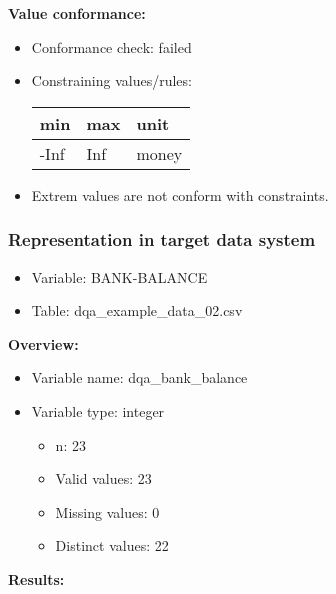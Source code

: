 \documentclass[
]{article}
\providecommand{\tightlist}{%
  \setlength{\itemsep}{0pt}\setlength{\parskip}{0pt}}
\begin{document}
\textbf{Value conformance:}

\begin{itemize}
\tightlist
\item
  Conformance check: failed
\item
  Constraining values/rules:

  \begin{table}[H]
  \centering
  \begin{tabular}{l|l|l}
  \hline
  \textbf{min} & \textbf{max} & \textbf{unit}\\
  \hline
  -Inf & Inf & money\\
  \hline
  \end{tabular}
  \end{table}
\item
  Extrem values are not conform with constraints.
\end{itemize}

\newpage

\hypertarget{representation-in-target-data-system-4}{%
\subsubsection{\texorpdfstring{Representation in \textbf{target} data
system}{Representation in target data system}}\label{representation-in-target-data-system-4}}

\begin{itemize}
\tightlist
\item
  Variable: BANK-BALANCE
\item
  Table: dqa\_example\_data\_02.csv
\end{itemize}

\textbf{Overview:}

\begin{itemize}
\tightlist
\item
  Variable name: dqa\_bank\_balance
\item
  Variable type: integer

  \begin{itemize}
  \tightlist
  \item
    n: 23
  \item
    Valid values: 23
  \item
    Missing values: 0
  \item
    Distinct values: 22
  \end{itemize}
\end{itemize}

\textbf{Results:}\\
\end{document}
